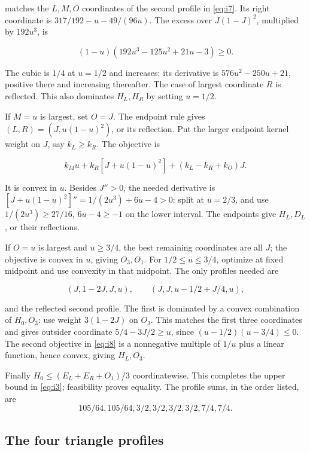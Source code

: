 matches the \(L,M,O\) coordinates of the second profile in \eqref{eq:i7}. Its right
coordinate is \(317/192-u-49/(96u)\). The excess over \(J(1-J)^2\),
multiplied by \(192u^3\), is

\[
(1-u)(192u^3-125u^2+21u-3)\ge0.
\]

The cubic is \(1/4\) at \(u=1/2\) and increases: its derivative is
\(576u^2-250u+21\), positive there and increasing thereafter. The case of
largest coordinate \(R\) is reflected. This also dominates \(H_L,H_R\)
by setting \(u=1/2\).

If \(M=u\) is largest, set \(O=J\). The endpoint rule gives
\((L,R)=(J,u(1-u)^2)\), or its reflection. Put the larger endpoint kernel
weight on \(J\), say \(k_L\ge k_R\). The objective is

\[
k_Mu+k_R[J+u(1-u)^2]+(k_L-k_R+k_O)J.
\]

It is convex in \(u\). Besides \(J''>0\), the needed derivative is
\([J+u(1-u)^2]''=1/(2u^3)+6u-4>0\): split at \(u=2/3\), and use
\(1/(2u^3)\ge27/16\), \(6u-4\ge-1\) on the lower interval.
The endpoints give \(H_L,D_L\), or their reflections.

If \(O=u\) is largest and \(u\ge3/4\), the best remaining coordinates are
all \(J\); the objective is convex in \(u\), giving \(O_3,O_1\). For
\(1/2\le u\le3/4\), optimize at fixed midpoint and use convexity in that
midpoint. The only profiles needed are

\begin{equation}\label{eq:i8}
(J,1-2J,J,u),\qquad (J,J,u-1/2+J/4,u),
\end{equation}

and the reflected second profile. The first is dominated by a convex
combination of \(H_0,O_3\): use weight \(3(1-2J)\) on \(O_3\).
This matches the first three coordinates and gives outsider coordinate
\(5/4-3J/2\ge u\), since \((u-1/2)(u-3/4)\le0\). The second objective
in \eqref{eq:i8} is a nonnegative multiple of \(1/u\) plus a linear function, hence
convex, giving \(H_L,O_3\).

Finally \(H_0\le(E_L+E_R+O_1)/3\) coordinatewise. This completes the
upper bound in \eqref{eq:i3}; feasibility proves equality. The profile sums,
in the order listed, are
\[
105/64,105/64,3/2,3/2,3/2,3/2,7/4,7/4.
\]

\subsection{The four triangle profiles}\label{sec:i-triangles}

